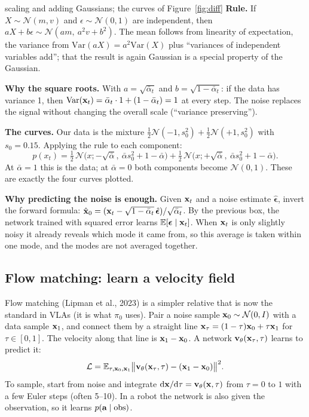 \begin{probbox}{scaling and adding Gaussians; the curves of Figure~\ref{fig:diff}}
\textbf{Rule.} If $X\sim\mathcal N(m,v)$ and $\epsilon\sim\mathcal N(0,1)$ are independent, then $aX+b\epsilon\sim\mathcal N(am,\ a^2v+b^2)$. The mean follows from linearity of expectation, the variance from $\mathrm{Var}(aX)=a^2\mathrm{Var}(X)$ plus ``variances of independent variables add''; that the result is again Gaussian is a special property of the Gaussian.

\textbf{Why the square roots.} With $a=\sqrt{\bar\alpha_t}$ and $b=\sqrt{1-\bar\alpha_t}$: if the data has variance 1, then $\mathrm{Var}(\mathbf{x}_t)=\bar\alpha_t\cdot1+(1-\bar\alpha_t)=1$ at every step. The noise replaces the signal without changing the overall scale (``variance preserving'').

\textbf{The curves.} Our data is the mixture $\tfrac12\mathcal N(-1,s_0^2)+\tfrac12\mathcal N(+1,s_0^2)$ with $s_0=0.15$. Applying the rule to each component:
\[
p(x_t)=\tfrac12\,\mathcal N\big(x;-\sqrt{\bar\alpha},\ \bar\alpha s_0^2+1-\bar\alpha\big)+\tfrac12\,\mathcal N\big(x;+\sqrt{\bar\alpha},\ \bar\alpha s_0^2+1-\bar\alpha\big).
\]
At $\bar\alpha=1$ this is the data; at $\bar\alpha=0$ both components become $\mathcal N(0,1)$. These are exactly the four curves plotted.

\textbf{Why predicting the noise is enough.} Given $\mathbf{x}_t$ and a noise estimate $\hat{\bm\epsilon}$, invert the forward formula: $\hat{\mathbf{x}}_0=(\mathbf{x}_t-\sqrt{1-\bar\alpha_t}\,\hat{\bm\epsilon})/\sqrt{\bar\alpha_t}$. By the previous box, the network trained with squared error learns $\mathbb{E}[\bm\epsilon\mid\mathbf{x}_t]$. When $\mathbf{x}_t$ is only slightly noisy it already reveals which mode it came from, so this average is taken within one mode, and the modes are not averaged together.
\end{probbox}

\subsection{Flow matching: learn a velocity field}
Flow matching (Lipman et al., 2023) is a simpler relative that is now the standard in VLAs (it is what $\pi_0$ uses). Pair a noise sample $\mathbf{x}_0\sim\mathcal N(0,I)$ with a data sample $\mathbf{x}_1$, and connect them by a straight line $\mathbf{x}_\tau=(1-\tau)\mathbf{x}_0+\tau\mathbf{x}_1$ for $\tau\in[0,1]$. The velocity along that line is $\mathbf{x}_1-\mathbf{x}_0$. A network $\mathbf{v}_\theta(\mathbf{x}_\tau,\tau)$ learns to predict it:
\begin{equation}
\mathcal L=\mathbb{E}_{\tau,\mathbf{x}_0,\mathbf{x}_1}\big\lVert \mathbf{v}_\theta(\mathbf{x}_\tau,\tau)-(\mathbf{x}_1-\mathbf{x}_0)\big\rVert^2 .
\end{equation}
To sample, start from noise and integrate $\mathrm d\mathbf{x}/\mathrm d\tau=\mathbf{v}_\theta(\mathbf{x},\tau)$ from $\tau=0$ to $1$ with a few Euler steps (often 5--10). In a robot the network is also given the observation, so it learns $p(\mathbf{a}\mid\text{obs})$.

